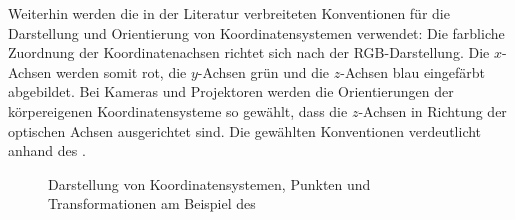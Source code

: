 

Weiterhin werden die in der Literatur verbreiteten Konventionen für die Darstellung und Orientierung von Koordinatensystemen verwendet: Die farbliche Zuordnung der Koordinatenachsen richtet sich nach der RGB-Darstellung. Die $x$-Achsen werden somit rot, die $y$-Achsen grün und die $z$-Achsen blau eingefärbt abgebildet. Bei Kameras und Projektoren werden die Orientierungen der körpereigenen Koordinatensysteme so gewählt, dass die $z$-Achsen in Richtung der optischen Achsen ausgerichtet sind. Die gewählten Konventionen verdeutlicht  anhand des .

\begin{figure}[ht]
	\begin{center}%
		\caption{Darstellung von Koordinatensystemen, Punkten und Transformationen am Beispiel des }
		\label{fig.coords}
	\end{center}
\end{figure}


